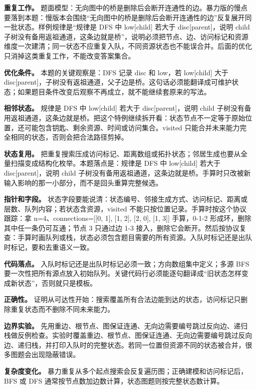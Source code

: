 \textbf{重复工作。} 题面模型：无向图中的桥是删除后会断开连通性的边。暴力版的慢点要落到本题：慢版本会围绕“无向图中的桥是删除后会断开连通性的边”反复展开同一批状态。样例规律是“规律是 DFS 中 low[child] 若大于 disc[parent]，说明 child 子树没有备用返祖通道，这条边就是桥”，说明必须把节点、边、访问标记和资源维度一次建清；同一状态不应重复入队，不同资源状态也不能误合并。后面的优化只消掉这类重复工作，不能改变答案集合。

\textbf{优化条件。} 本题的关键观察是：DFS 记录 disc 和 low，若 low[child] 大于 disc[parent]，子树没有返祖通道，父子边是桥。这句话必须能翻译成可维护状态；如果题目条件改变后观察不再成立，就不能继续套原来的写法。

\textbf{相邻状态。} 规律是 DFS 中 low[child] 若大于 disc[parent]，说明 child 子树没有备用返祖通道，这条边就是桥。把这个特例继续拆开看：状态节点不一定等于原始位置，还可能包含钥匙、剩余资源、时间或访问集合。visited 只能合并未来能力完全相同的状态，否则会把合法路径剪掉。

\textbf{状态复用。} 把重复搜索压成访问标记、距离数组或拓扑状态；邻居生成也要从全量扫描变成结构化枚举。本题落点是：规律是 DFS 中 low[child] 若大于 disc[parent]，说明 child 子树没有备用返祖通道，这条边就是桥。手算时只改被新输入影响的那一小部分，而不是回头重算完整候选。

\textbf{指针和字段。} 状态字段要能说清：状态编号、邻接生成方式、访问标记、距离或层数、队列内容；若状态含资源，visited 不能只按位置记录。手算时按这个协议跟踪：拿 n=4、connections=[[0, 1], [1, 2], [2, 0], [1, 3]] 手算，0-1-2 形成环，删除其中任一条仍可互通；节点 3 只通过边 1-3 接入，删除它会断开。然后按协议复查：手算时画队列或栈，状态必须包含题目需要的所有资源。入队时标记还是出队时标记，要和去重语义一致。

\textbf{代码落点。} 入队时标记还是出队时标记必须一致；方向数组集中定义；多源 BFS 要一次性把所有源点放入初始队列。关键代码行必须能逐句翻译成“旧状态怎样变成新状态”，否则就只是模板。

\textbf{正确性。} 证明从可达性开始：搜索覆盖所有合法边能到达的状态，访问标记只删除重复状态而不删除不同未来能力。

\textbf{边界实验。} 先用重边、根节点、图保证连通、无向边需要编号跳过反向边、递归栈做反例检查。实验时覆盖重边、根节点、图保证连通、无向边需要编号跳过反向边、递归栈，并打印入队时的完整状态。若同一位置但资源不同的状态被合并，很多图题会出现隐蔽错误。

\textbf{复杂度变化。} 暴力重复从多个起点搜索会反复遍历图；正确建模和访问标记后，BFS 或 DFS 通常按节点数加边数计算，状态图题则按完整状态数计算。

